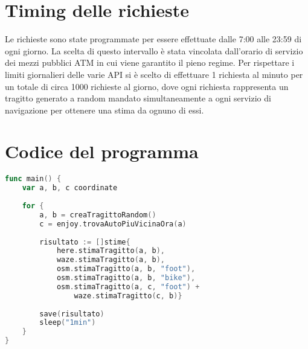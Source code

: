 \section{Timing delle richieste}

Le richieste sono state programmate per essere effettuate dalle 7:00 alle 23:59 di ogni giorno. La scelta di questo intervallo è stata vincolata dall'orario di servizio dei mezzi pubblici ATM in cui viene garantito il pieno regime. Per rispettare i limiti giornalieri delle varie API si è scelto di effettuare 1 richiesta al minuto per un totale di circa 1000 richieste al giorno, dove ogni richiesta rappresenta un tragitto generato a random mandato simultaneamente a ogni servizio di navigazione per ottenere una stima da ognuno di essi.

\section{Codice del programma}

\begin{lstlisting}[language=Go]
func main() {
	var a, b, c coordinate
	
	for {
		a, b = creaTragittoRandom()
		c = enjoy.trovaAutoPiuVicinaOra(a)
		
		risultato := []stime{
			here.stimaTragitto(a, b),
			waze.stimaTragitto(a, b),
			osm.stimaTragitto(a, b, "foot"),
			osm.stimaTragitto(a, b, "bike"),
			osm.stimaTragitto(a, c, "foot") +
				waze.stimaTragitto(c, b)}
		
		save(risultato)
		sleep("1min")
	}
}
\end{lstlisting}